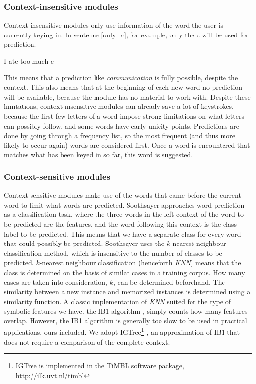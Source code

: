 \documentclass[12pt]{article}
\begin{document}
\subsubsection{Context-insensitive modules} \label{ci}

Context-insensitive modules only use information of the word the user is currently keying in. In sentence \ref{only_c}, for example, only the c will be used for prediction. 

\begin{examples}
\item I ate too much c \label{only_c}
\end{examples}

This means that a prediction like \emph{communication} is fully possible, despite the context. This also means that at the beginning of each new word no prediction will be available, because the module has no material to work with. Despite these limitations, context-insensitive modules can already save a lot of keystrokes, because the first few letters of a word impose strong limitations on what letters can possibly follow, and some words have early unicity points. Predictions are done by going through a frequency list, so the most frequent (and thus more likely to occur again) words are considered first. Once a word is encountered that matches what has been keyed in so far, this word is suggested.

\subsubsection{Context-sensitive modules} \label{cs}

Context-sensitive modules make use of the words that came before the current word to limit what words are predicted. Soothsayer approaches word prediction as a classification task, where the three words in the left context of the word to be predicted are the features, and the word following this context is the class label to be predicted. This means that we have a separate class for every word that could possibly be predicted. Soothsayer uses the $k$-nearest neighbour classification method, which is insensitive to the number of classes to be predicted. $k$-nearest neighbour classification (henceforth \emph{KNN}) means that the class is determined on the basis of similar cases in a training corpus. How many cases are taken into consideration, $k$, can be determined beforehand. The similarity between a new instance and memorized instances is determined using a similarity function.  A classic implementation of \emph{KNN} suited for the type of symbolic features we have, the IB1-algorithm \cite{aha+91}, simply counts how many features overlap. However, the IB1 algorithm is generally too slow to be used in practical applications, ours included. We adopt IGTree\footnote{IGTree is implemented in the TiMBL software package, \url{http://ilk.uvt.nl/timbl}} \cite{daelemans+97}, an approximation of IB1 that does not require a comparison of the complete context.
\end{document}
